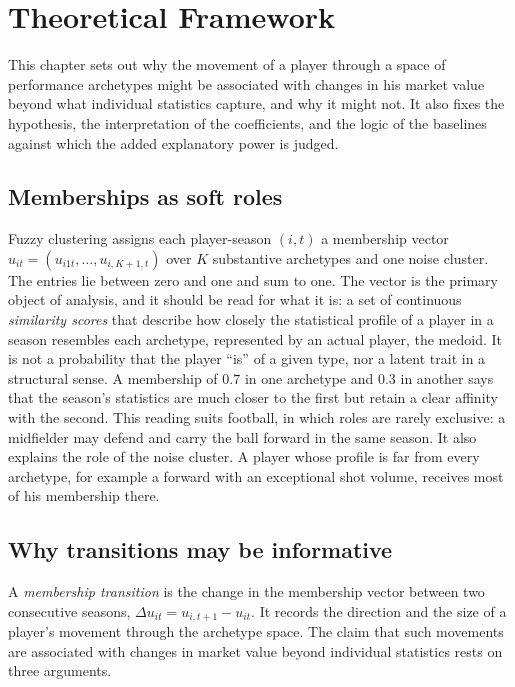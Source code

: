 \chapter{Theoretical Framework}
\label{ch:theory}

This chapter sets out why the movement of a player through a space of performance archetypes might be associated with changes in his market value beyond what individual statistics capture, and why it might not. It also fixes the hypothesis, the interpretation of the coefficients, and the logic of the baselines against which the added explanatory power is judged.

\section{Memberships as soft roles}
\label{sec:theory-memberships}

Fuzzy clustering assigns each player-season $(i,t)$ a membership vector $u_{it}=(u_{i1t},\dots,u_{i,K+1,t})$ over $K$ substantive archetypes and one noise cluster. The entries lie between zero and one and sum to one. The vector is the primary object of analysis, and it should be read for what it is: a set of continuous \emph{similarity scores} that describe how closely the statistical profile of a player in a season resembles each archetype, represented by an actual player, the medoid. It is not a probability that the player ``is'' of a given type, nor a latent trait in a structural sense. A membership of $0.7$ in one archetype and $0.3$ in another says that the season's statistics are much closer to the first but retain a clear affinity with the second. This reading suits football, in which roles are rarely exclusive: a midfielder may defend and carry the ball forward in the same season. It also explains the role of the noise cluster. A player whose profile is far from every archetype, for example a forward with an exceptional shot volume, receives most of his membership there.

\section{Why transitions may be informative}
\label{sec:theory-why}

A \emph{membership transition} is the change in the membership vector between two consecutive seasons, $\Delta u_{it}=u_{i,t+1}-u_{it}$. It records the direction and the size of a player's movement through the archetype space. The claim that such movements are associated with changes in market value beyond individual statistics rests on three arguments.

